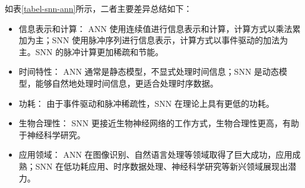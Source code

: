 \documentclass[12pt, a4paper, oneside]{ctexart}
\numberwithin{equation}{section}  %
\begin{document}
如表\ref{tabel-snn-ann}所示，二者主要差异总结如下：
\begin{itemize}
    \item 信息表示和计算： ANN 使用连续值进行信息表示和计算，计算方式以乘法累加为主；SNN 使用脉冲序列进行信息表示，计算方式以事件驱动的加法为主。SNN 的脉冲计算更加稀疏和节能。
    \item 时间特性： ANN 通常是静态模型，不显式处理时间信息；SNN 是动态模型，能够自然地处理时间信息，更适合处理时序数据。
    \item 功耗： 由于事件驱动和脉冲稀疏性，SNN 在理论上具有更低的功耗。
    \item 生物合理性： SNN 更接近生物神经网络的工作方式，生物合理性更高，有助于神经科学研究。
    \item 应用领域： ANN 在图像识别、自然语言处理等领域取得了巨大成功，应用成熟；SNN 在低功耗应用、时序数据处理、神经科学研究等新兴领域展现出潜力。
\end{itemize}
\end{document}
